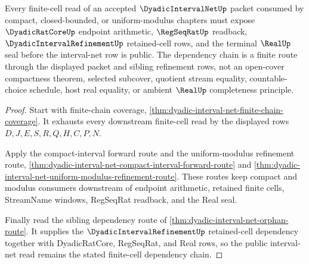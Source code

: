 \begin{theorem}\label{thm:dyadic-interval-net-finite-cell-dependency-chain}
Every finite-cell read of an accepted $\DyadicIntervalNetUp$ packet consumed by compact, closed-bounded, or uniform-modulus chapters must expose $\DyadicRatCoreUp$ endpoint arithmetic, $\RegSeqRatUp$ readback, $\DyadicIntervalRefinementUp$ retained-cell rows, and the terminal $\RealUp$ seal before the interval-net row is public. The dependency chain is a finite route through the displayed packet and sibling refinement rows, not an open-cover compactness theorem, selected subcover, quotient stream equality, countable-choice schedule, host real equality, or ambient $\RealUp$ completeness principle.
\end{theorem}
\begin{proof}
Start with finite-chain coverage, \autoref{thm:dyadic-interval-net-finite-chain-coverage}. It exhausts every downstream finite-cell read by the displayed rows $D,J,E,S,R,Q,H,C,P,N$.

Apply the compact-interval forward route and the uniform-modulus refinement route, \autoref{thm:dyadic-interval-net-compact-interval-forward-route} and \autoref{thm:dyadic-interval-net-uniform-modulus-refinement-route}. These routes keep compact and modulus consumers downstream of endpoint arithmetic, retained finite cells, StreamName windows, RegSeqRat readback, and the Real seal.

Finally read the sibling dependency route of \autoref{thm:dyadic-interval-net-orphan-route}. It supplies the $\DyadicIntervalRefinementUp$ retained-cell dependency together with DyadicRatCore, RegSeqRat, and Real rows, so the public interval-net read remains the stated finite-cell dependency chain.
\end{proof}

